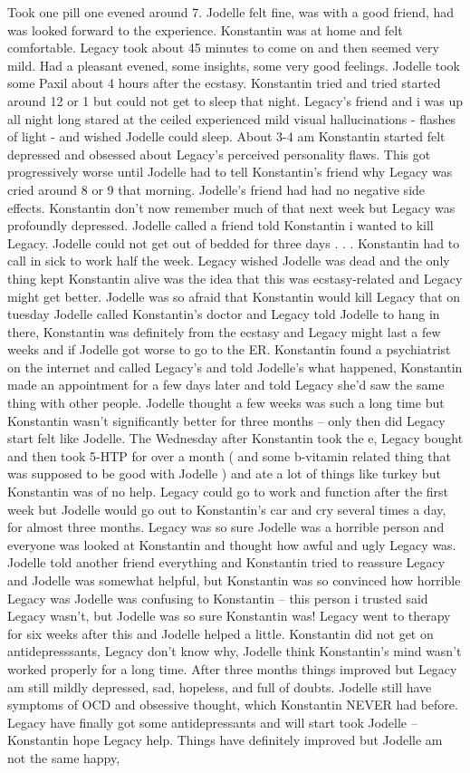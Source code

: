 \documentclass[12pt]{book}
\begin{document}
Took one pill one evened around 7. Jodelle felt fine, was with a good friend, had was looked forward to the experience. Konstantin was at home and felt comfortable. Legacy took about 45 minutes to come on and then seemed very mild. Had a pleasant evened, some insights, some very good feelings. Jodelle took some Paxil about 4 hours after the ecstasy. Konstantin tried and tried started around 12 or 1 but could not get to sleep that night. Legacy's friend and i was up all night long stared at the ceiled experienced mild visual hallucinations - flashes of light - and wished Jodelle could sleep. About 3-4 am Konstantin started felt depressed and obsessed about Legacy's perceived personality flaws. This got progressively worse until Jodelle had to tell Konstantin's friend why Legacy was cried around 8 or 9 that morning. Jodelle's friend had had no negative side effects. Konstantin don't now remember much of that next week but Legacy was profoundly depressed. Jodelle called a friend told Konstantin i wanted to kill Legacy. Jodelle could not get out of bedded for three days  . . .  Konstantin had to call in sick to work half the week. Legacy wished Jodelle was dead and the only thing kept Konstantin alive was the idea that this was ecstasy-related and Legacy might get better. Jodelle was so afraid that Konstantin would kill Legacy that on tuesday Jodelle called Konstantin's doctor and Legacy told Jodelle to hang in there, Konstantin was definitely from the ecstasy and Legacy might last a few weeks and if Jodelle got worse to go to the ER. Konstantin found a psychiatrist on the internet and called Legacy's and told Jodelle's what happened, Konstantin made an appointment for a few days later and told Legacy she'd saw the same thing with other people. Jodelle thought a few weeks was such a long time but Konstantin wasn't significantly better for three months -- only then did Legacy start felt like Jodelle. The Wednesday after Konstantin took the e, Legacy bought and then took 5-HTP for over a month ( and some b-vitamin related thing that was supposed to be good with Jodelle ) and ate a lot of things like turkey but Konstantin was of no help. Legacy could go to work and function after the first week but Jodelle would go out to Konstantin's car and cry several times a day, for almost three months. Legacy was so sure Jodelle was a horrible person and everyone was looked at Konstantin and thought how awful and ugly Legacy was. Jodelle told another friend everything and Konstantin tried to reassure Legacy and Jodelle was somewhat helpful, but Konstantin was so convinced how horrible Legacy was Jodelle was confusing to Konstantin -- this person i trusted said Legacy wasn't, but Jodelle was so sure Konstantin was! Legacy went to therapy for six weeks after this and Jodelle helped a little. Konstantin did not get on antidepresssants, Legacy don't know why, Jodelle think Konstantin's mind wasn't worked properly for a long time. After three months things improved but Legacy am still mildly depressed, sad, hopeless, and full of doubts. Jodelle still have symptoms of OCD and obsessive thought, which Konstantin NEVER had before. Legacy have finally got some antidepressants and will start took Jodelle -- Konstantin hope Legacy help. Things have definitely improved but Jodelle am not the same happy, 
\end{document}
